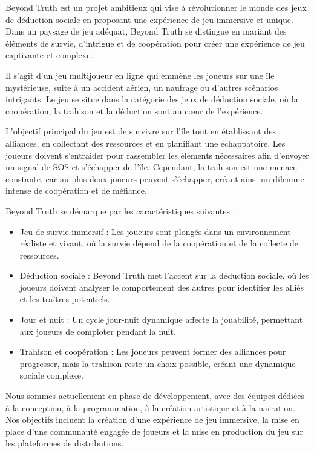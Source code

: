 \documentclass[
	article,			%
	11pt,				%
	oneside,			%
	a4paper,			%
	chapter=TITLE,
	french,			%
	sumario=tradicional
	]{base_nt}
\begin{document}
Beyond Truth est un projet ambitieux qui vise à révolutionner le monde des jeux de déduction sociale en proposant une expérience de jeu immersive et unique. Dans un paysage de jeu adéquat, Beyond Truth se distingue en mariant des éléments de survie, d'intrigue et de coopération pour créer une expérience de jeu captivante et complexe.

Il s'agit d'un jeu multijoueur en ligne qui emmène les joueurs sur une île mystérieuse, suite à un accident aérien, un naufrage ou d'autres scénarios intrigants. Le jeu se situe dans la catégorie des jeux de déduction sociale, où la coopération, la trahison et la déduction sont au cœur de l'expérience.

L'objectif principal du jeu est de survivre sur l'île tout en établissant des alliances, en collectant des ressources et en planifiant une échappatoire. Les joueurs doivent s'entraider pour rassembler les éléments nécessaires afin d'envoyer un signal de SOS et s'échapper de l'île. Cependant, la trahison est une menace constante, car au plus deux joueurs peuvent s'échapper, créant ainsi un dilemme intense de coopération et de méfiance.

Beyond Truth se démarque par les caractéristiques suivantes :
\begin{itemize}
    \item Jeu de survie immersif : Les joueurs sont plongés dans un environnement réaliste et vivant, où la survie dépend de la coopération et de la collecte de ressources.
    \item Déduction sociale : Beyond Truth met l'accent sur la déduction sociale, où les joueurs doivent analyser le comportement des autres pour identifier les alliés et les traîtres potentiels.
    \item Jour et nuit : Un cycle jour-nuit dynamique affecte la jouabilité, permettant aux joueurs de comploter pendant la nuit.
    \item Trahison et coopération : Les joueurs peuvent former des alliances pour progresser, mais la trahison reste un choix possible, créant une dynamique sociale complexe.
\end{itemize}

Nous sommes actuellement en phase de développement, avec des équipes dédiées à la conception, à la programmation, à la création artistique et à la narration. Nos objectifs incluent la création d'une expérience de jeu immersive, la mise en place d'une communauté engagée de joueurs et la mise en production du jeu sur les plateformes de distributions.
\end{document}
